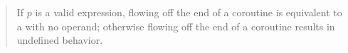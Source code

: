 \begin{quote}
\pnum 
If $p$ is a valid expression, flowing off the end of a coroutine is equivalent to a  with no operand; otherwise flowing off the end of a coroutine results in undefined behavior.


%

\end{quote}

%
%
%
%
%
%
%  


%
%
%    
%

